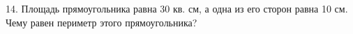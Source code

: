 14. Площадь прямоугольника равна 30 кв. см, а одна из его сторон равна 10 см. Чему равен периметр этого прямоугольника?\\
